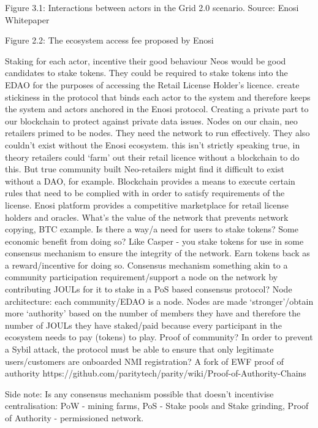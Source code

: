\documentclass{article}
\theoremstyle{definition}
\theoremstyle{plain} %
\begin{document}
Figure 3.1: Interactions between actors in the Grid 2.0 scenario. Source: Enosi Whitepaper





Figure 2.2: The ecosystem access fee proposed by Enosi



Staking for each actor, incentive their good behaviour
Neos would be good candidates to stake tokens. They could be required to stake tokens into the EDAO for the purposes of accessing the Retail License Holder’s licence. 
create stickiness in the protocol that binds each actor to the system and therefore keeps the system and actors anchored in the Enosi protocol.
Creating a private part to our blockchain to protect against private data issues.
Nodes on our chain, neo retailers primed to be nodes. They need the network to run effectively. They also couldn’t exist without the Enosi ecosystem.
this isn’t strictly speaking true, in theory retailers could ‘farm’ out their retail licence without a blockchain to do this.
But true community built Neo-retailers might find it difficult to exist without a DAO, for example. 
Blockchain provides a means to execute certain rules that need to be complied with in order to satisfy requirements of the license.
Enosi platform provides a competitive marketplace for retail license holders and oracles.
What’s the value of the network that prevents network copying, BTC example. 
Is there a way/a need for users to stake tokens?
Some economic benefit from doing so? Like Casper - you stake tokens for use in some consensus mechanism to ensure the integrity of the network. Earn tokens back as a reward/incentive for doing so.
Consensus mechanism something akin to a community participation requirement/support a node on the network by contributing JOULs for it to stake in a PoS based consensus protocol?
Node architecture: each community/EDAO is a node. Nodes are made ‘stronger’/obtain more ‘authority’ based on the number of members they have and therefore the number of JOULs they have staked/paid because every participant in the ecosystem needs to pay (tokens) to play.
Proof of community?
In order to prevent a Sybil attack, the protocol must be able to ensure that only legitimate users/customers are onboarded
NMI registration?
A fork of EWF proof of authority
https://github.com/paritytech/parity/wiki/Proof-of-Authority-Chains

Side note: Is any consensus mechanism possible that doesn’t incentivise centralisation: PoW - mining farms, PoS - Stake pools and Stake grinding, Proof of Authority - permissioned network. 
\end{document}
